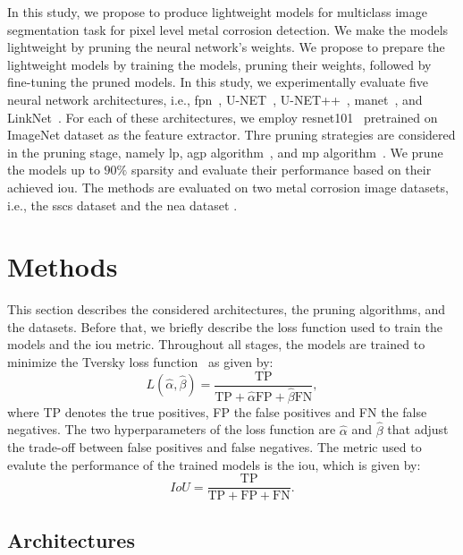 \documentclass[mathematics,article,submit,pdftex,moreauthors]{Definitions/mdpi}
\begin{document}
In this study, we propose to produce lightweight
models for multiclass image segmentation
task for pixel level metal corrosion detection.
We make the models lightweight by pruning the neural 
network's weights. We propose to prepare the lightweight models
by training the models, pruning their weights, followed
by fine-tuning the pruned models. 
In this study,
we experimentally evaluate five neural network
architectures, i.e., \ac{fpn}~\cite{Lin2017}, U-NET~\cite{Ronneberger2015},
U-NET++~\cite{Zhou2018}, \ac{manet}~\cite{Fan2020}, and 
LinkNet~\cite{Chaurasia2017}. For each of these architectures,
we employ \ac{resnet101}~\cite{He2016} pretrained on ImageNet
dataset as the feature extractor. Thre pruning strategies
are considered in the pruning stage, namely
\ac{lp}, \ac{agp} algorithm~\cite{Han2017},
and \ac{mp} algorithm~\cite{Sanh2020}. We prune
the models up to $90\%$ sparsity and 
evaluate their performance based on their
achieved \ac{iou}. The methods
are evaluated on two metal corrosion image datasets,
i.e., the \ac{sscs} dataset \cite{Bianchi2021Dataset,Bianchi2022Journal} and 
the \ac{nea} dataset \cite{Liu2023}. 


\section{Methods}
This section describes the considered architectures,
the pruning algorithms, and the datasets. Before that,
we briefly describe the loss function used to 
train the models and the \ac{iou} metric.
Throughout all stages, the models are trained to minimize
the Tversky loss function~\cite{Salehi2017} as given
by:
\begin{equation}
    L(\hat{\alpha}, \hat{\beta}) = \frac{\text{TP}}{\text{TP}+
    \hat{\alpha}\text{FP} +  \hat{\beta}\text{FN}},
\end{equation}
where TP denotes the true positives, FP the false positives
and FN the false negatives. The two hyperparameters of 
the loss function are $\hat{\alpha}$ and $\hat{\beta}$
that adjust the trade-off between false positives and
false negatives. The metric used to evalute the performance of the trained
models is the \ac{iou}, which is given by:
\begin{equation}
    IoU = \frac{\text{TP}}{\text{TP}+\text{FP}+\text{FN}}.
\end{equation}


\subsection{Architectures}
\end{document}

